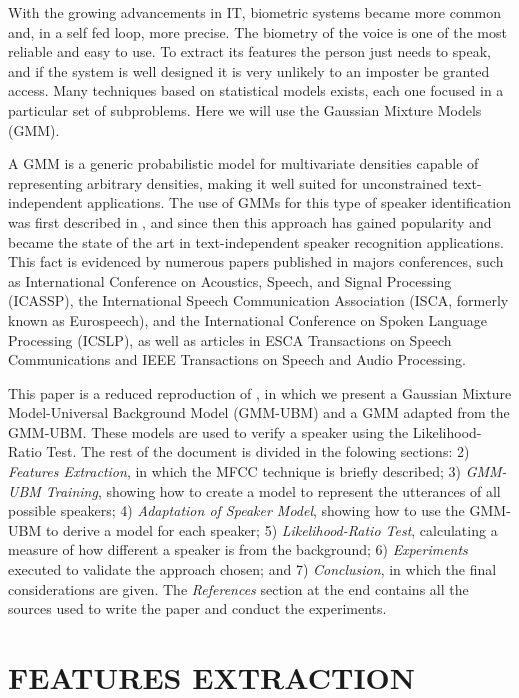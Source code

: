 \documentclass[a4paper,twocolumn]{article}
\begin{document}
With the growing advancements in IT, biometric systems became more common and, in a self fed loop, more precise. The biometry of the voice is one of the most reliable and easy to use. To extract its features the person just needs to speak, and if the system is well designed it is very unlikely to an imposter be granted access. Many techniques based on statistical models exists, each one focused in a particular set of subproblems. Here we will use the Gaussian Mixture Models (GMM).

A GMM is a generic probabilistic model for multivariate densities capable of representing arbitrary densities, making it well suited for unconstrained text-independent applications. The use of GMMs for this type of speaker identification was first described in \cite{rose_reynolds_1990}, and since then this approach has gained popularity and became the state of the art in text-independent speaker recognition applications. This fact is evidenced by numerous papers published in majors conferences, such as International Conference on Acoustics, Speech, and Signal Processing (ICASSP), the International Speech Communication Association (ISCA, formerly known as Eurospeech), and the International Conference on Spoken Language Processing (ICSLP), as well as articles in ESCA Transactions on Speech Communications and IEEE Transactions on Speech and Audio Processing.

This paper is a reduced reproduction of \cite{reynolds_quatieri_dunn_2000}, in which we present a Gaussian Mixture Model-Universal Background Model (GMM-UBM) and a GMM adapted from the GMM-UBM. These models are used to verify a speaker using the Likelihood-Ratio Test. The rest of the document is divided in the folowing sections: 2) \textit{Features Extraction}, in which the MFCC technique is briefly described; 3) \textit{GMM-UBM Training}, showing how to create a model to represent the utterances of all possible speakers; 4) \textit{Adaptation of Speaker Model}, showing how to use the GMM-UBM to derive a model for each speaker; 5) \textit{Likelihood-Ratio Test}, calculating a measure of how different a speaker is from the background; 6) \textit{Experiments} executed to validate the approach chosen; and 7) \textit{Conclusion}, in which the final considerations are given. The \textit{References} section at the end contains all the sources used to write the paper and conduct the experiments.


\section{FEATURES EXTRACTION}
\label{feat_ext}
\end{document}
